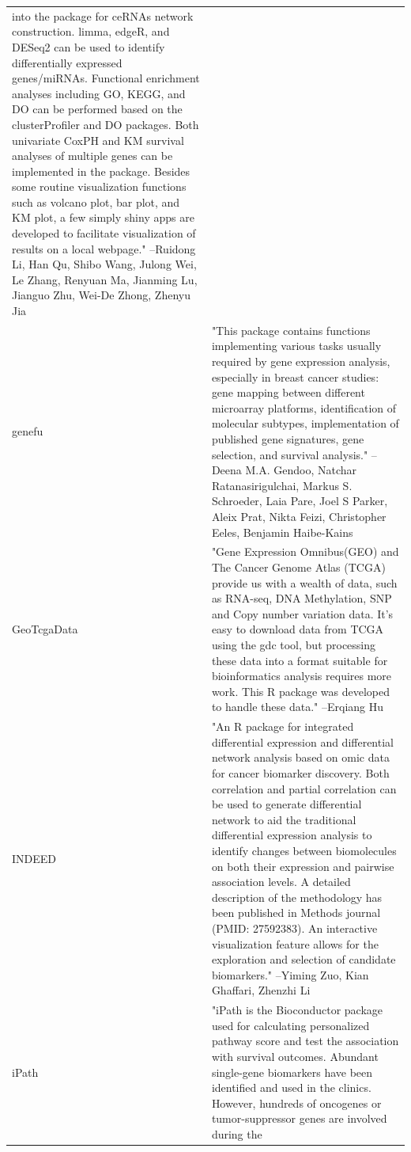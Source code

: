 \documentclass[]{article}
\begin{document}
\begin{longtable}[t]{l>{\raggedright\arraybackslash}p{25em}}
into the package for ceRNAs network construction. limma, edgeR,
and DESeq2 can be used to identify differentially expressed
genes/miRNAs. Functional enrichment analyses including GO,
KEGG, and DO can be performed based on the clusterProfiler and
DO packages. Both univariate CoxPH and KM survival analyses of
multiple genes can be implemented in the package. Besides some
routine visualization functions such as volcano plot, bar plot,
and KM plot, a few simply shiny apps are developed to
facilitate visualization of results on a local webpage." --Ruidong Li, Han Qu, Shibo Wang, Julong Wei, Le Zhang, Renyuan Ma, Jianming Lu, Jianguo Zhu, Wei-De Zhong, Zhenyu Jia\\
genefu & "This package contains functions implementing various tasks
usually required by gene expression analysis, especially in
breast cancer studies: gene mapping between different
microarray platforms, identification of molecular subtypes,
implementation of published gene signatures, gene selection,
and survival analysis." --Deena M.A. Gendoo, Natchar Ratanasirigulchai, Markus S. Schroeder, Laia Pare, Joel S Parker, Aleix Prat, Nikta Feizi, Christopher Eeles, Benjamin Haibe-Kains\\
GeoTcgaData & "Gene Expression Omnibus(GEO) and The Cancer Genome Atlas
(TCGA) provide us with a wealth of data, such as RNA-seq, DNA
Methylation, SNP and Copy number variation data. It's easy to
download data from TCGA using the gdc tool, but processing
these data into a format suitable for bioinformatics analysis
requires more work. This R package was developed to handle
these data." --Erqiang Hu\\
INDEED & "An R package for integrated differential expression and
differential network analysis based on omic data for cancer
biomarker discovery. Both correlation and partial correlation
can be used to generate differential network to aid the
traditional differential expression analysis to identify
changes between biomolecules on both their expression and
pairwise association levels. A detailed description of the
methodology has been published in Methods journal (PMID:
27592383). An interactive visualization feature allows for the
exploration and selection of candidate biomarkers." --Yiming Zuo, Kian Ghaffari, Zhenzhi Li\\
iPath & "iPath is the Bioconductor package used for calculating
personalized pathway score and test the association with
survival outcomes. Abundant single-gene biomarkers have been
identified and used in the clinics. However, hundreds of
oncogenes or tumor-suppressor genes are involved during the

\end{longtable}
\end{document}
